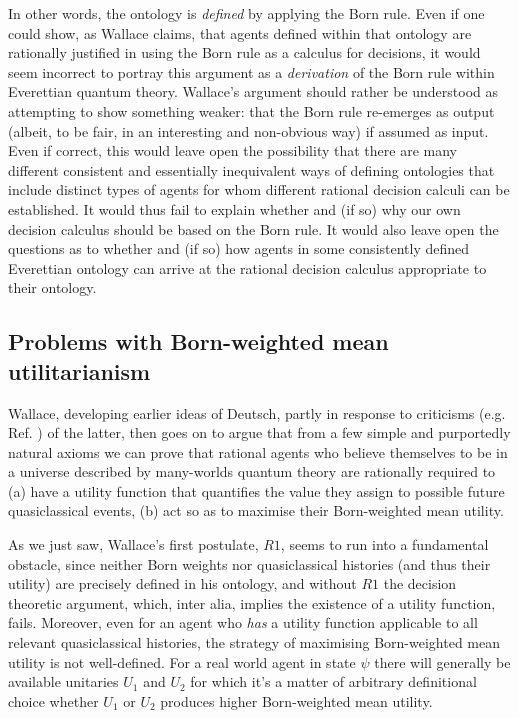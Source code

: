 \documentclass[aps,
pra,epsfig]{revtex4}
\begin{document}
In other words, the ontology is {\it defined} by applying the Born rule.   
Even if one could show, as Wallace claims, that agents defined within that 
ontology are rationally justified in using the Born rule as a 
calculus for decisions, it would seem incorrect to portray this
argument as a {\it derivation} of the Born rule within Everettian
quantum theory.   Wallace's argument should rather be understood
as attempting to show something weaker: that the Born rule re-emerges as output
(albeit, to be fair, in an interesting and non-obvious way) 
if assumed as input.  
Even if correct, this would leave 
open the possibility that there are many different 
consistent and essentially inequivalent ways of defining ontologies 
that include distinct types of agents for whom different rational 
decision calculi can be established.
It would thus fail to explain whether and (if so) why our own decision calculus
should be based on the Born rule.  It
would also leave open the questions as to whether and (if so) how   
agents in some consistently defined Everettian ontology can arrive 
at the rational decision calculus appropriate to their ontology. 

\subsection{Problems with Born-weighted mean utilitarianism} 

Wallace\cite{wallacevoltwo}, developing earlier 
ideas of Deutsch\cite{deutschtwo}, partly 
in response to criticisms (e.g. Ref. \cite{barnumetal}) of 
the latter, 
then goes on to argue that from a few simple and purportedly 
natural axioms we can prove that  
rational agents who believe 
themselves to be in a universe described by many-worlds quantum theory
are rationally required to (a) have a utility function that quantifies 
the value they assign to possible future quasiclassical events,
(b) act so as to maximise their Born-weighted mean utility.

As we just saw, Wallace's first postulate, $R1$, seems to run
into a fundamental obstacle, since neither Born weights nor 
quasiclassical histories (and thus their utility) are precisely
defined in his ontology, and without $R1$ the decision theoretic 
argument, which, inter alia, implies the existence of a utility function, 
fails.   Moreover, even for an agent who {\it has}
a utility function applicable to all relevant quasiclassical
histories, the strategy of maximising Born-weighted mean utility
is not well-defined.  For a real world agent in state $\psi$
there will generally be available unitaries $U_1$ and $U_2$ for 
which it's a matter of arbitrary definitional choice 
whether $U_1$ or $U_2$ produces higher Born-weighted mean utility. 
\end{document}
